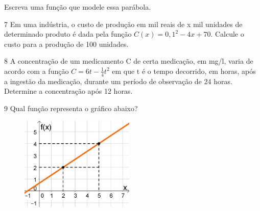 \begin{escolha}
\begin{escolha}
Escreva uma função que modele essa parábola.

\begin{largebox}
\end{largebox}

\num{7} Em uma indústria, o custo de produção em mil reais de x mil unidades
de determinado produto é dada pela função $ C(x) = 0,1^2 - 4x + 70$. Calcule 
o custo para a produção de 100 unidades.


\num{8} A concentração de um medicamento C de certa medicação, em mg/l, varia de
acordo com a função $C = 6t - \frac{1}{4} t^2$ em que t é o tempo decorrido, em 
horas, após a ingestão da medicação, durante um período de observação de 24 horas.
Determine a concentração após 12 horas.

\begin{boxpeq}
\end{boxpeq}

\num{9} Qual função representa o gráfico abaixo?

\begin{figure}
\centering
\includegraphics[width=2.14105in,height=1.76667in]{./_SAEB_9_MAT/media/image150.jpeg}
\end{figure}


\end{escolha}
\end{escolha}
